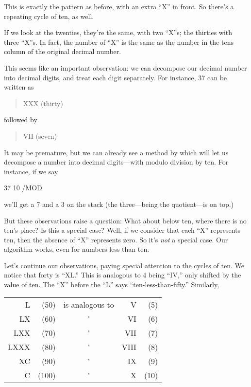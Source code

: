 \medskip
\noindent This is exactly the pattern as before, with an extra ``X''
in front. So there's a repeating cycle of ten, as well.

If we look at the twenties, they're the same, with two ``X''s; the
thirties with three ``X''s. In fact, the number of ``X'' is the same as the
number in the tens column of the original decimal number.

This seems like an important observation: we can decompose our decimal
number into decimal digits, and treat each digit separately. For instance,
37 can be written as

\begin{quote}
{\sf XXX (thirty)}
\end{quote}

\noindent followed by

\begin{quote}
{\sf VII (seven)}
\end{quote}

\noindent It may be premature, but we can already see a method by
which \Forth{} will let us decompose a number into decimal digits---with
modulo division by ten. For instance, if we say

\begin{Code}
37 10 /MOD
\end{Code}
we'll get a 7 and a 3 on the stack (the three---being the quotient---is on
top.)

But these observations raise a question: What about below ten, where there
is no ten's place? Is this a special case? Well, if we consider that
each ``X'' represents ten, then the absence of ``X'' represents zero.  So
it's \emph{not} a special case. Our algorithm works, even for numbers less
than ten.

Let's continue our observations, paying special attention to the
cycles of ten. We notice that forty is ``XL.'' This is analogous to 4 being
``IV,'' only shifted by the value of ten. The ``X'' before the ``L'' says
``ten-less-than-fifty.'' Similarly,

\bigskip
{\sf\begin{tabular}{rrcrr}
   L &  (50) &   is analogous to &     V & (5) \\
  LX &  (60) &          "        &    VI & (6) \\
 LXX &  (70) &          "        &   VII & (7) \\
LXXX &  (80) &          "        &  VIII & (8) \\
  XC &  (90) &          "        &    IX & (9) \\
   C & (100) &          "        &     X & (10) \\
\end{tabular}}
\bigskip

